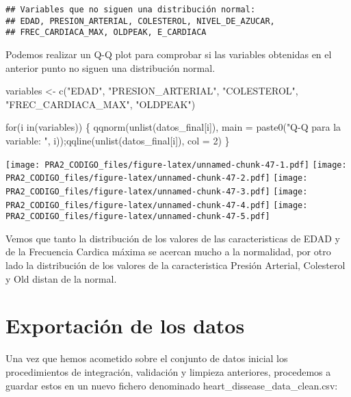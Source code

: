 \documentclass[
]{article}
\newenvironment{Shaded}{\begin{snugshade}}{\end{snugshade}}
\newcommand{\AttributeTok}[1]{\textcolor[rgb]{0.80,0.80,0.80}{#1}}
\newcommand{\ControlFlowTok}[1]{\textcolor[rgb]{0.94,0.87,0.69}{#1}}
\newcommand{\DecValTok}[1]{\textcolor[rgb]{0.86,0.86,0.80}{#1}}
\newcommand{\FunctionTok}[1]{\textcolor[rgb]{0.94,0.94,0.56}{#1}}
\newcommand{\NormalTok}[1]{\textcolor[rgb]{0.80,0.80,0.80}{#1}}
\newcommand{\OtherTok}[1]{\textcolor[rgb]{0.94,0.94,0.56}{#1}}
\newcommand{\StringTok}[1]{\textcolor[rgb]{0.80,0.58,0.58}{#1}}
\begin{document}
\begin{verbatim}
## Variables que no siguen una distribución normal:
## EDAD, PRESION_ARTERIAL, COLESTEROL, NIVEL_DE_AZUCAR, 
## FREC_CARDIACA_MAX, OLDPEAK, E_CARDIACA
\end{verbatim}

Podemos realizar un Q-Q plot para comprobar si las variables obtenidas
en el anterior punto no siguen una distribución normal.

\begin{Shaded}
\begin{Highlighting}[]
\NormalTok{variables }\OtherTok{\textless{}{-}} \FunctionTok{c}\NormalTok{(}\StringTok{"EDAD"}\NormalTok{, }\StringTok{"PRESION\_ARTERIAL"}\NormalTok{, }\StringTok{"COLESTEROL"}\NormalTok{,}
               \StringTok{"FREC\_CARDIACA\_MAX"}\NormalTok{, }\StringTok{"OLDPEAK"}\NormalTok{)}


\ControlFlowTok{for}\NormalTok{(i }\ControlFlowTok{in}\NormalTok{(variables))}
\NormalTok{\{}
  \FunctionTok{qqnorm}\NormalTok{(}\FunctionTok{unlist}\NormalTok{(datos\_final[i]),  }\AttributeTok{main =} \FunctionTok{paste0}\NormalTok{(}\StringTok{"Q{-}Q para la variable: "}\NormalTok{, i));}\FunctionTok{qqline}\NormalTok{(}\FunctionTok{unlist}\NormalTok{(datos\_final[i]), }\AttributeTok{col =} \DecValTok{2}\NormalTok{)}
\NormalTok{\}}
\end{Highlighting}
\end{Shaded}

\texttt{[image: PRA2\_CODIGO\_files/figure-latex/unnamed-chunk-47-1.pdf]}
\texttt{[image: PRA2\_CODIGO\_files/figure-latex/unnamed-chunk-47-2.pdf]}
\texttt{[image: PRA2\_CODIGO\_files/figure-latex/unnamed-chunk-47-3.pdf]}
\texttt{[image: PRA2\_CODIGO\_files/figure-latex/unnamed-chunk-47-4.pdf]}
\texttt{[image: PRA2\_CODIGO\_files/figure-latex/unnamed-chunk-47-5.pdf]}

Vemos que tanto la distribución de los valores de las caracteristicas de
EDAD y de la Frecuencia Cardica máxima se acercan mucho a la normalidad,
por otro lado la distribución de los valores de la caracteristica
Presión Arterial, Colesterol y Old distan de la normal.

\hypertarget{exportaciuxf3n-de-los-datos}{%
\section{Exportación de los datos}\label{exportaciuxf3n-de-los-datos}}

Una vez que hemos acometido sobre el conjunto de datos inicial los
procedimientos de integración, validación y limpieza anteriores,
procedemos a guardar estos en un nuevo fichero denominado
heart\_dissease\_data\_clean.csv:
\end{document}
